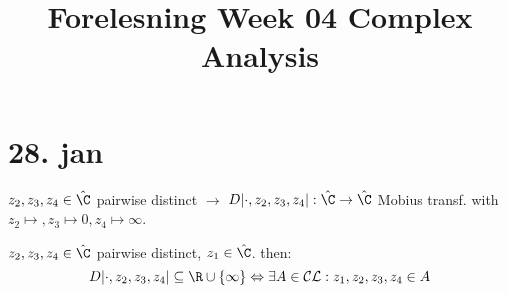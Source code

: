 \title{Forelesning Week 04 Complex Analysis}
\maketitle
\section{28. jan}

\begin{recall}
  $z_2,z_3,z_4 \in \hat{\C}$ pairwise distinct $\rightarrow$ $D| \cdot,z_2,z_3,z_4|:\hat{\C}\to \hat{\C}$ Mobius transf. with $z_2\mapsto, z_3\mapsto 0,z_4\mapsto \infty$.
\end{recall}

\begin{proposition}
  $z_2,z_3,z_4 \in \hat{\C}$ pairwise distinct, $z_1\in \hat{\C}$. then:
      $$D| \cdot,z_2,z_3,z_4| \subseteq \R\cup\{\infty\} \Leftrightarrow \exists A\in \mathcal{CL}: z_1,z_2,z_3,z_4\in A$$
\end{proposition}
